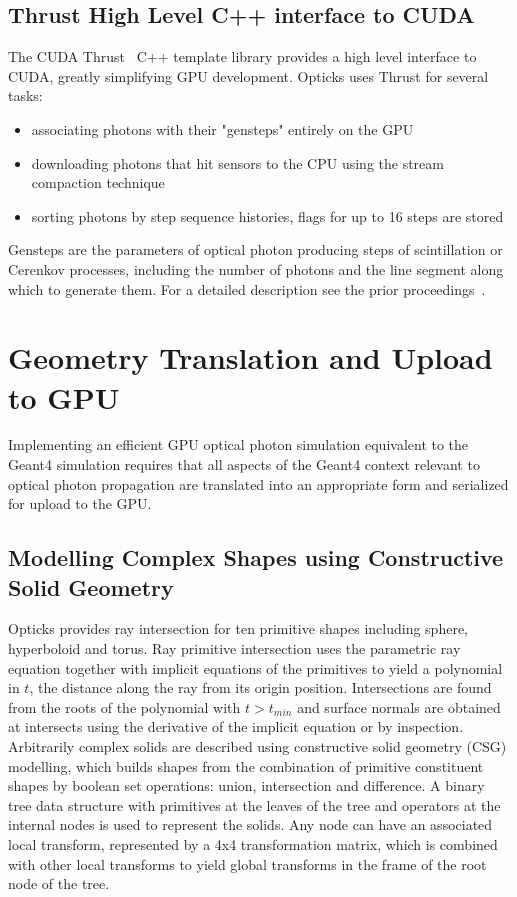 \documentclass{webofc}
\begin{document}
\subsection{Thrust High Level C++ interface to CUDA}
%
The CUDA Thrust~\cite{thrust} C++ template library provides a high level interface to CUDA, 
greatly simplifying GPU development. Opticks uses Thrust for several tasks:
%
\begin{itemize}
\item associating photons with their "gensteps" entirely on the GPU
\item downloading photons that hit sensors to the CPU using the stream compaction technique
\item sorting photons by step sequence histories, flags for up to 16 steps are stored
\end{itemize} 
%
Gensteps are the parameters of optical photon producing steps of scintillation or Cerenkov processes, 
including the number of photons and the line segment along which to generate them.
For a detailed description see the prior proceedings~\cite{chep2016}.
%
\section{Geometry Translation and Upload to GPU}
\label{geometry}
%
Implementing an efficient GPU optical photon simulation equivalent to the Geant4 simulation 
requires that all aspects of the Geant4 context relevant to optical photon propagation are 
translated into an appropriate form and serialized for upload to the GPU.
%
\subsection{Modelling Complex Shapes using Constructive Solid Geometry}
%
Opticks provides ray intersection for ten primitive shapes including sphere, hyperboloid and torus.
Ray primitive intersection uses the parametric ray equation together with implicit equations 
of the primitives to yield a polynomial in $t$, the distance along the ray from its origin position. 
Intersections are found from the roots of the polynomial with $t > t_{min}$ and surface normals are obtained at intersects
using the derivative of the implicit equation or by inspection.
%
Arbitrarily complex solids are described using constructive solid geometry (CSG) modelling, 
which builds shapes from the combination of primitive constituent shapes by boolean set operations: union, intersection and difference.
A binary tree data structure with primitives at the leaves of the tree and operators at the internal nodes is used
to represent the solids. Any node can have an associated local transform, represented by a 4x4 transformation matrix, which 
is combined with other local transforms to yield global transforms in the frame of the root node of the tree.
%
\end{document}
